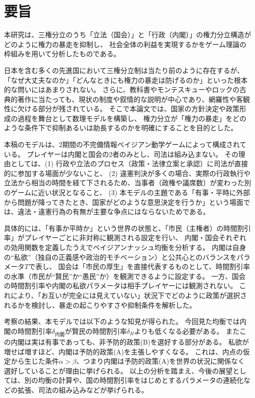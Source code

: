 \documentclass[main.tex]{subfiles}
\begin{document}
\section*{要旨}

本研究は、三権分立のうち「立法（国会）」と「行政（内閣）」の権力分立構造がどのように権力の暴走を抑制し、
社会全体の利益を実現するかをゲーム理論の枠組みを用いて分析したものである。

日本を含む多くの先進国において三権分立制は当たり前のように存在するが、「なぜ大丈夫なのか」「どんなときにも権力の暴走は防げるのか」といった根本的な問いにはあまりされない。
さらに、教科書やモンテスキューやロックの古典的著作に当たっても、現状の制度や叙情的な説明が中心であり、網羅性や客観性に欠ける部分が残されている。
そこで本論文では、国家の方針決定や政策形成の過程を舞台として数理モデルを構築し、
権力分立が「権力の暴走」をどのような条件下で抑制あるいは助長するのかを明確にすることを目的とした。

本稿のモデルは、2期間の不完備情報ベイジアン動学ゲームによって構成されている。
プレイヤーは内閣と国会の2者のみとし、司法は組み込まない。
その理由としては、(1) 行政や立法のプロセス（政策・法律立案と承認）に司法が直接的に参加する場面が少ないこと、
(2) 違憲判決が多くの場合、実際の行政執行や立法から相当の時間を経て下されるため、当事者（政権や議席数）が変わった別のゲームに近い状況となること、
(3) 本モデルの主題である「有事・平時に外部から問題が降ってきたとき、国家がどのような意思決定を行うか」という場面では、違法・違憲行為の有無が主要な争点にはならないためである。

具体的には、「有事か平時か」という世界の状態と、「市民（主権者）の時間割引率」がプレイヤーごとに非対称に観測される設定を行い、
内閣・国会それぞれの効用関数を定義したうえでベイジアンナッシュ均衡を分析する。
内閣は自身の“私欲”（独自の正義感や政治的モチベーション）と公共心とのバランスをパラメータ$T$で表し、
国会は「市民の厚生」を直接代表するものとして、時間割引率の水準（市民が“賢民”か“愚民”か）を観測できるように設定する。
一方、国会の時間割引率や内閣の私欲パラメータは相手プレイヤーには観測されない。
これにより、「お互いが完全には見えていない」状況下でどのように政策が選択されるかを検討し、暴走の起こりやすさや抑制条件を解析した。

考察の結果、本モデルでは以下のような知見が得られた。
今回見た均衡では内閣の時間割引率$\delta_{内閣}$が賢民の時間割引率$\delta_H$よりも低くなる必要がある。
またこの内閣は実は有事であっても、非予防的政策(B)を選好する部分がある。
私欲が増せば増すほど、内閣は予防的政策(A)を主張しやすくなる。
これは、内点の仮定から生じた条件$\alpha>\beta$、つまり内閣は予防的政策(A)を世界の状況に関係なく選好していることが理由に挙げられる。
以上の分析を踏まえ、今後の展望としては、別の均衡の計算や、国の時間割引率をはじめとするパラメータの連続化などの拡張、司法の組み込みなどが挙げられる。
\end{document}
